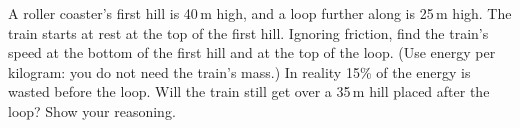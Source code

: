 \label{prac:5}


\label{ext:5}

\task A roller coaster's first hill is 40\,m high, and a loop further along is 25\,m high. The train starts at rest at the top of the first hill.
Ignoring friction, find the train's speed at the bottom of the first hill and at the top of the loop. (Use energy per kilogram: you do not need the train's mass.)
In reality 15\% of the energy is wasted before the loop. Will the train still get over a 35\,m hill placed after the loop? Show your reasoning.

\clearpage
\setcounter{section}{5}\renewcommand{\lessonart}{11}
\label{sec:6}

\setcounter{section}{6}\renewcommand{\lessonart}{14}
\label{sec:7}
